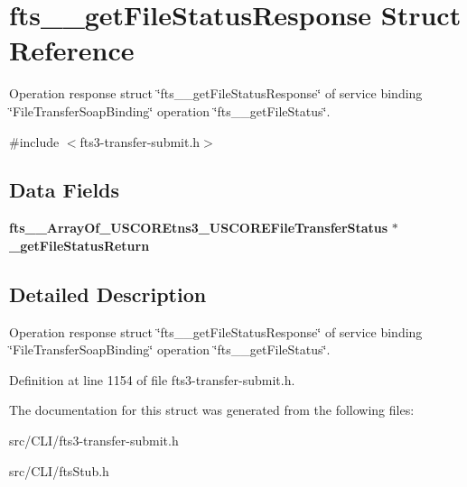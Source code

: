 \section{fts\_\-\_\-getFileStatusResponse Struct Reference}
\label{structfts____getFileStatusResponse}


Operation response struct \char`\"{}fts\_\-\_\-getFileStatusResponse\char`\"{} of service binding \char`\"{}FileTransferSoapBinding\char`\"{} operation \char`\"{}fts\_\-\_\-getFileStatus\char`\"{}.  




{\ttfamily \#include $<$fts3-\/transfer-\/submit.h$>$}

\subsection*{Data Fields}
\begin{DoxyCompactItemize}
\item 
{\bf fts\_\-\_\-ArrayOf\_\-USCOREtns3\_\-USCOREFileTransferStatus} $\ast$ {\bfseries \_\-getFileStatusReturn}\label{structfts____getFileStatusResponse_ae3bf43e8e99cf21f0e3a5dbc0dfd70fc}

\end{DoxyCompactItemize}


\subsection{Detailed Description}
Operation response struct \char`\"{}fts\_\-\_\-getFileStatusResponse\char`\"{} of service binding \char`\"{}FileTransferSoapBinding\char`\"{} operation \char`\"{}fts\_\-\_\-getFileStatus\char`\"{}. 

Definition at line 1154 of file fts3-\/transfer-\/submit.h.



The documentation for this struct was generated from the following files:\begin{DoxyCompactItemize}
\item 
src/CLI/fts3-\/transfer-\/submit.h\item 
src/CLI/ftsStub.h\end{DoxyCompactItemize}
